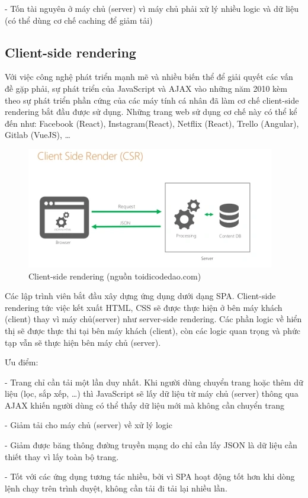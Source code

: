 \documentclass[12pt]{report}
\begin{document}
- Tốn tài nguyên ở máy chủ (server) vì máy chủ phải xử lý nhiều logic và dữ liệu (có thể dùng cơ chế caching để giảm tải)

\subsection{Client-side rendering}
Với việc công nghệ phát triển mạnh mẽ và nhiều biến thể để giải quyết các vấn đề gặp phải, sự phát triển của JavaScript và AJAX vào những năm 2010 kèm theo sự phát triển phần cứng của các máy tính cá nhân đã làm cơ chế client-side rendering bắt đầu được sử dụng. Những trang web sử dụng cơ chế này có thể kể đến như: Facebook (React), Instagram(React), Netflix (React), Trello (Angular), Gitlab (VueJS), …

\begin{figure}[h]
	\centering
	\includegraphics[scale=1]{Image/3.2.png}
	\caption{Client-side rendering (nguồn toidicodedao.com) }
	\label{fig:image3.2}
\end{figure}

Các lập trình viên bắt đầu xây dựng ứng dụng dưới dạng SPA. Client-side rendering tức việc kết xuất HTML, CSS sẽ được thực hiện ở bên máy khách (client) thay vì máy chủ(server) như server-side rendering. Các phần logic về hiển thị sẽ được thực thi tại bên máy khách (client), còn các logic quan trọng và phức tạp vẫn sẽ thực hiện bên máy chủ (server).

Ưu điểm:

- Trang chỉ cần tải một lần duy nhất. Khi người dùng chuyển trang hoặc thêm dữ liệu (lọc, sắp xếp, …) thì JavaScript sẽ lấy dữ liệu từ máy chủ (server) thông qua AJAX khiến người dùng có thể thấy dữ liệu mới mà không cần chuyển trang

- Giảm tải cho máy chủ (server) về xử lý logic

- Giảm được băng thông đường truyền mạng do chỉ cần lấy JSON là dữ liệu cần thiết thay vì lấy toàn bộ trang.

- Tốt với các ứng dụng tương tác nhiều, bởi vì SPA hoạt động tốt hơn khi dòng lệnh chạy trên trình duyệt, không cần tải đi tải lại nhiều lần.
\end{document}
